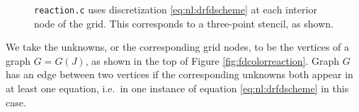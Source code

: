 \begin{figure}

\medskip
{}
\medskip

\caption{\texttt{reaction.c} uses discretization \eqref{eq:nl:drfdscheme} at each interior node of the grid.  This corresponds to a three-point stencil, as shown.}
\label{fig:stencilreaction}
\end{figure}

We take the unknowns, or the corresponding grid nodes, to be the vertices of a graph $G=G(J)$, as shown in the top of Figure \ref{fig:fdcolorreaction}.  Graph $G$ has an edge between two vertices if the corresponding unknowns both appear in at least one equation, i.e.~in one instance of equation \eqref{eq:nl:drfdscheme} in this case.

